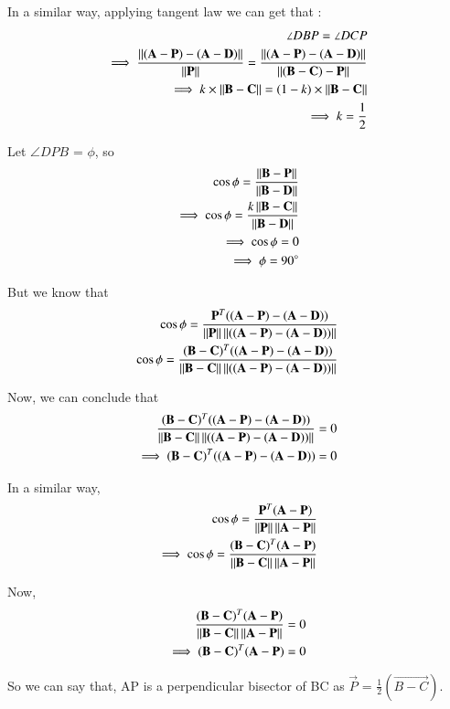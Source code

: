 \documentclass[journal,12pt,twocolumn]{IEEEtran}
\begin{document}
In a similar way, applying tangent law we can get that :
\begin{align}
\angle DBP = \angle DCP\\
\implies \frac{\left\lVert(\mathbf{A-P})-(\mathbf{A-D})\right\rVert}{\left\lVert\mathbf{P}\right\rVert} = \frac{\left\lVert(\mathbf{A-P})-(\mathbf{A-D})\right\rVert}{\left\lVert(\mathbf{B-C})-\mathbf{P}\right\rVert}\\
\implies k \times \left\lVert\mathbf{B-C}\right\rVert = (1-k) \times \left\lVert\mathbf{B-C}\right\rVert\\
\implies k= \frac{1}{2}
\end{align}

Let $\angle DPB$ = $\phi$, so
\begin{align}
\cos\phi = \frac{\left\lVert\mathbf{B-P}\right\rVert}{\left\lVert\mathbf{B-D}\right\rVert}\\
\implies \cos\phi = \frac{k \left\lVert\mathbf{B-C}\right\rVert}{\left\lVert\mathbf{B-D}\right\rVert}\\
\implies \cos\phi = 0\\
\implies \phi = 90 \degree
\end{align}

But we know that 
\begin{align}
\cos\phi = \frac{\mathbf{P}^T ((\mathbf{A-P}) - (\mathbf{A-D}))}{\left\lVert\mathbf{P}\right\rVert\left\lVert((\mathbf{A-P}) - (\mathbf{A-D}))\right\rVert}\\
\cos\phi = \frac{(\mathbf{B-C})^T ((\mathbf{A-P}) - (\mathbf{A-D}))}{\left\lVert\mathbf{B-C}\right\rVert\left\lVert((\mathbf{A-P}) - (\mathbf{A-D}))\right\rVert}
\end{align}

Now, we can conclude that 
\begin{align}
\frac{(\mathbf{B-C})^T ((\mathbf{A-P}) - (\mathbf{A-D}))}{\left\lVert\mathbf{B-C}\right\rVert\left\lVert((\mathbf{A-P}) - (\mathbf{A-D}))\right\rVert} = 0\\
\implies (\mathbf{B-C})^T ((\mathbf{A-P}) - (\mathbf{A-D})) = 0
\end{align}

In a similar way,
\begin{align}
\cos\phi = \frac{\mathbf{P}^T (\mathbf{A-P})}{\left\lVert\mathbf{P}\right\rVert\left\lVert\mathbf{A-P}\right\rVert}\\
\implies \cos\phi = \frac{(\mathbf{B-C})^T (\mathbf{A-P})}{\left\lVert\mathbf{B-C}\right\rVert\left\lVert\mathbf{A-P}\right\rVert}\\
\end{align}

Now, 
\begin{align}
\frac{(\mathbf{B-C})^T (\mathbf{A-P})}{\left\lVert\mathbf{B-C}\right\rVert\left\lVert\mathbf{A-P}\right\rVert} = 0\\
\implies (\mathbf{B-C})^T (\mathbf{A-P}) = 0
\end{align}

So we can say that, AP is a perpendicular bisector of BC as $\vec{P}$ = $\frac{1}{2} (\vec{B-C})$.
\end{document}
